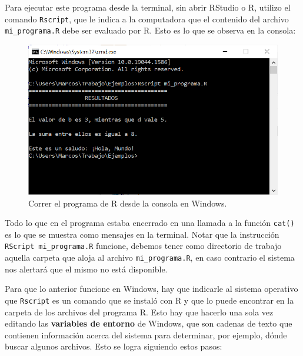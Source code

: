 \documentclass[
]{book}
\begin{document}
Para ejecutar este programa desde la terminal, sin abrir RStudio o R, utilizo el comando \texttt{Rscript}, que le indica a la computadora que el contenido del archivo \texttt{mi\_programa.R} debe ser evaluado por R. Esto es lo que se observa en la consola:

\begin{figure}

{\centering \includegraphics[width=0.8\linewidth]{images/07_otros/terminal7} 

}

\caption{Correr el programa de R desde la consola en Windows.}\label{fig:unnamed-chunk-113}
\end{figure}

Todo lo que en el programa estaba encerrado en una llamada a la función \texttt{cat()} es lo que se muestra como mensajes en la terminal. Notar que la instrucción \texttt{RScript\ mi\_programa.R} funcione, debemos tener como directorio de trabajo aquella carpeta que aloja al archivo \texttt{mi\_programa.R}, en caso contrario el sistema nos alertará que el mismo no está disponible.

Para que lo anterior funcione en Windows, hay que indicarle al sistema operativo que \texttt{Rscript} es un comando que se instaló con R y que lo puede encontrar en la carpeta de los archivos del programa R. Esto hay que hacerlo una sola vez editando las \textbf{variables de entorno} de Windows, que son cadenas de texto que contienen información acerca del sistema para determinar, por ejemplo, dónde buscar algunos archivos. Esto se logra siguiendo estos pasos:
\end{document}
